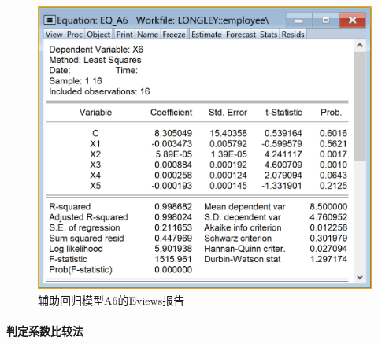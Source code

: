 \documentclass[12pt,(landscape,a4paper),(portrait,a4paper)]{article}
\let\oldparagraph\paragraph
\renewcommand{\paragraph}[1]{\oldparagraph{#1}\mbox{}}
\begin{document}
\begin{figure}

{\centering \includegraphics[width=8in]{picture/lab5-multilinearity/3-A6} 

}

\caption{辅助回归模型A6的Eviews报告}\label{fig:fig-A6}
\end{figure}

\paragraph{判定系数比较法}
\end{document}
